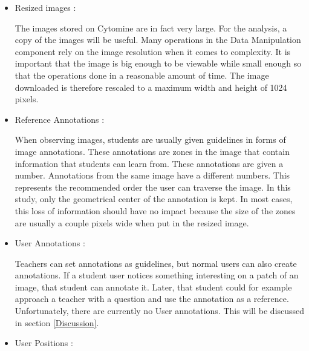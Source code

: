 \documentclass[a4paper,11pt]{report}
\numberwithin{figure}{section} %
\begin{document}
          \begin{itemize}
          \item[\textbullet] Resized images :\newline
          
          The images stored on Cytomine are in fact very large.
          For the analysis, a copy of the images will be useful.
          Many operations in the Data Manipulation component rely on the image resolution when it comes to complexity.
          It is important that the image is big enough to be viewable while small enough so that the operations done in a reasonable amount of time.
          The image downloaded is therefore rescaled to a maximum width and height of 1024 pixels.\\
          \item[\textbullet] Reference Annotations :\newline
          
          When observing images, students are usually given guidelines in forms of image annotations.
          These annotations are zones in the image that contain information that students can learn from.
          These annotations are given a number.
          Annotations from the same image have a different numbers.
          This represents the recommended order the user can traverse the image.
          In this study, only the geometrical center of the annotation is kept.
          In most cases, this loss of information should have no impact because the size of the zones are usually a couple pixels wide when put in the resized image.\\
		\item[\textbullet]  User Annotations :\newline
        
        Teachers can set annotations as guidelines, but normal users can also create annotations.
        If a student user notices something interesting on a patch of an image, that student can annotate it.
        Later, that student could for example approach a teacher with a question and use the annotation as a reference.
        Unfortunately, there are currently no User annotations.
        This will be discussed in section \ref{Discussion}.\\
        
        \item[\textbullet]  User Positions :\newline
        

\end{itemize}
\end{document}
